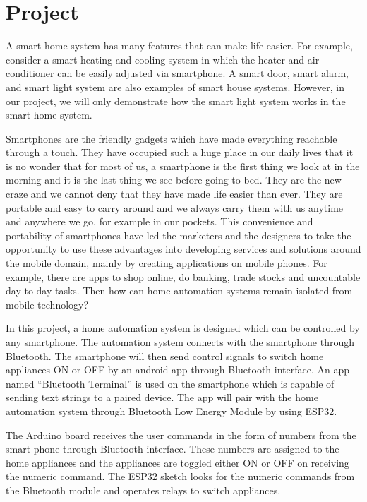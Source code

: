   \section{Project}
A smart home system has many features that can make life easier. For example, consider a smart heating and cooling system in which the heater and air conditioner can be easily adjusted via smartphone. A smart door, smart alarm, and smart light system are also examples of smart house systems. However, in our project, we will only demonstrate how the smart light system works in the smart home system.

Smartphones are the friendly gadgets which have made everything reachable through a touch. They have occupied such a huge place in our daily lives that it is no wonder that for most of us, a smartphone is the first thing we look at in the morning and it is the last thing we see before going to bed. They are the new craze and we cannot deny that they have made life easier than ever. They are portable and easy to carry around and we always carry them with us anytime and anywhere we go, for example in our pockets. This convenience and portability of smartphones have led the marketers and the designers to take the opportunity to use these advantages into developing services and solutions around the mobile domain, mainly by creating applications on mobile phones. For example, there are apps to shop online, do banking, trade stocks and uncountable day to day tasks. Then how can home automation systems remain isolated from mobile technology?
 
In this project, a home automation system is designed which can be controlled by any smartphone. The automation system connects with the smartphone through Bluetooth. The smartphone will then send control signals to switch home appliances ON or OFF by an android app through Bluetooth interface. An app named “Bluetooth Terminal” is used on the smartphone which is capable of sending text strings to a paired device. The app will pair with the home automation system through Bluetooth Low Energy Module by using ESP32.  
 
The Arduino board receives the user commands in the form of numbers from the smart phone through Bluetooth interface. These numbers are assigned to the home appliances and the appliances are toggled either ON or OFF on receiving the numeric command. The ESP32  sketch looks for the numeric commands from the Bluetooth module and operates relays to switch appliances.


